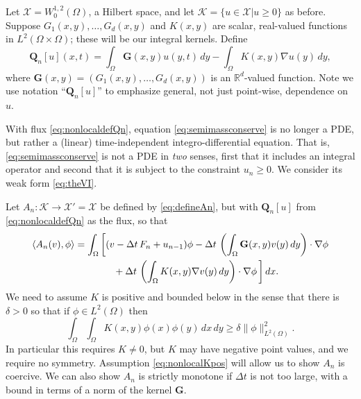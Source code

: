 \documentclass[final,leqno,onefignum,onetabnum]{siamltex1213bueler}
\newcommand\bG{\mathbf{G}}
\newcommand\bQ{\mathbf{Q}}
\renewcommand{\grad}{\nabla}
\newcommand{\ip}[2]{\ensuremath{\left<#1,#2\right>}}
\newcommand\RR{\mathbb{R}}
\begin{document}
Let $\mathcal{X} = W_0^{1,2}(\Omega)$, a Hilbert space, and let $\mathcal{K}=\{u\in\mathcal{X}|u\ge 0\}$ as before.  Suppose $G_1(x,y), \dots, G_d(x,y)$ and $K(x,y)$ are scalar, real-valued functions in $L^2(\Omega\times \Omega)$; these will be our integral kernels.  Define
\begin{equation}
\bQ_n[u](x,t) = \int_\Omega \bG(x,y) u(y,t)\,dy - \int_\Omega K(x,y) \grad u(y)\,dy, \label{eq:nonlocaldefQn}
\end{equation}
where $\bG(x,y) = (G_1(x,y), \dots, G_d(x,y))$ is an $\RR^d$-valued function.  Note we use notation ``$\bQ_n[u]$'' to emphasize general, not just point-wise, dependence on $u$.

With flux \eqref{eq:nonlocaldefQn}, equation \eqref{eq:semimassconserve} is no longer a PDE, but rather a (linear) time-independent integro-differential equation.  That is, \eqref{eq:semimassconserve} is not a PDE in \emph{two} senses, first that it includes an integral operator and second that it is subject to the constraint $u_n\ge 0$.  We consider its weak form \eqref{eq:theVI}.

Let $A_n:\mathcal{K} \to \mathcal{X}'=\mathcal{X}$ be defined by \eqref{eq:defineAn}, but with $\bQ_n[u]$ from \eqref{eq:nonlocaldefQn} as the flux, so that
\begin{align}
    \ip{A_n(v)}{\phi} &= \int_\Omega \bigg[(v - \Delta t\,F_n + u_{n-1})\phi - \Delta t\,\left(\int_\Omega \bG(x,y) v(y)\,dy\right)\cdot \grad \phi \label{eq:nonlocaldefnAn} \\
                      &\qquad\qquad + \Delta t\,\left(\int_\Omega K(x,y) \grad v(y)\,dy\right)\cdot \grad \phi\,\bigg]\,dx. \notag
\end{align}
We need to assume $K$ is positive and bounded below \cite{PorterStirling1990} in the sense that there is $\delta>0$ so that if $\phi \in L^2(\Omega)$ then
\begin{equation}
   \int_\Omega \int_\Omega K(x,y) \phi(x) \phi(y)\,dx\,dy \ge \delta \|\phi\|_{L^2(\Omega)}^2.  \label{eq:nonlocalKpos}
\end{equation}
In particular this requires $K\ne 0$, but $K$ may have negative point values, and we require no symmetry.  Assumption \eqref{eq:nonlocalKpos} will allow us to show $A_n$ is coercive.  We can also show $A_n$ is strictly monotone if $\Delta t$ is not too large, with a bound in terms of a norm of the kernel $\bG$.
\end{document}
